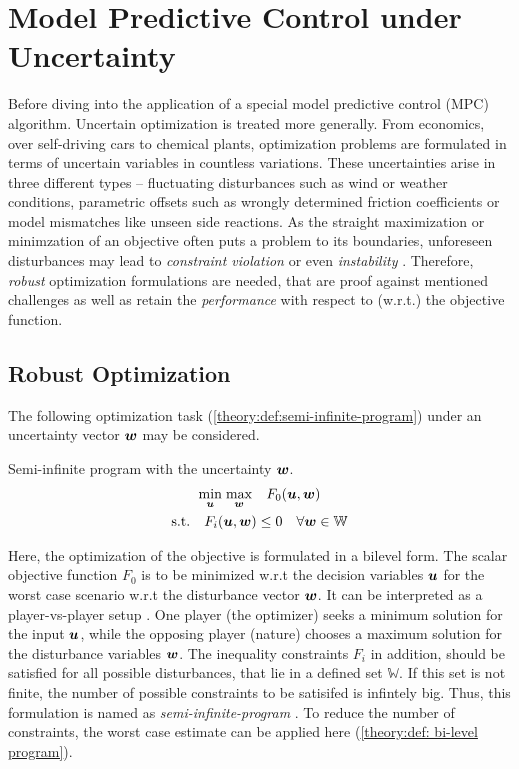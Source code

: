 \chapter{Model Predictive Control under Uncertainty}


Before diving into the application of a special model predictive control (MPC) algorithm. Uncertain
optimization is treated more generally. From economics, over self-driving cars to chemical plants,
optimization problems are formulated in terms of uncertain variables in countless variations.
These uncertainties arise in three different types – fluctuating disturbances such as wind or weather conditions,
parametric offsets such as wrongly determined friction coefficients or model mismatches like unseen side reactions.
As the straight maximization or minimzation of an objective often puts a problem to its boundaries,
unforeseen disturbances may lead to \emph{constraint violation} or even \emph{instability} \cite{houska2011}.
Therefore, \emph{robust} optimization formulations are needed, that are proof against mentioned challenges as
well as retain the \emph{performance} with respect to (w.r.t.) the objective function.
\newline

\section{Robust Optimization}

The following optimization task (\ref{theory:def:semi-infinite-program}) under an uncertainty vector ${\bm{w}}$
may be considered.
\begin{definition} Semi-infinite program with the uncertainty ${\bm{w}}$.
    \label{theory:def:semi-infinite-program}
    \[
    \begin{gathered}
        \underset{{\bm{u}}}{\min} \; \underset{{\bm{w}}}{\max} \quad F_0({\bm{u}}, {\bm{w}}) \\
        \text{s.t.} \quad F_i({\bm{u}}, {\bm{w}}) \leq 0 \quad \forall {\bm{w}} \in \mathbb{W}
    \end{gathered}
    \]
\end{definition}

\noindent
Here, the optimization of the objective is formulated in a bilevel form. The scalar objective function $F_0$ is to 
be minimized w.r.t the decision variables ${\bm{u}}$ for the worst case scenario w.r.t the disturbance
vector ${\bm{w}}$. It can be interpreted as a player-vs-player setup \cite{houska2011}. One player (the optimizer)
seeks a minimum solution for the input ${\bm{u}}$, while the opposing player (nature) chooses a maximum solution for the
disturbance variables ${\bm{w}}$. The inequality constraints $F_i$ in addition, should be satisfied for all possible disturbances, that
lie in a defined set $\mathbb{W}$. If this set is not finite, the number of possible 
constraints to be satisifed is infintely big. Thus, this formulation is named as \emph{semi-infinite-program} \cite{stein2003}.
To reduce the number of constraints, the worst case estimate can be applied here (\ref{theory:def: bi-level program}). 


